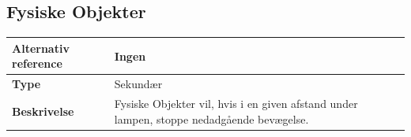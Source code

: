 \begin{table}[H] \centering
\subsection{Fysiske Objekter}
\begin{tabular}{|p{4cm}|p{8cm}|}
	\hline
	    \textbf{Alternativ reference}   & Ingen \\ \hline
	    \textbf{Type}                   & Sekundær \\ \hline
		\textbf{Beskrivelse}            & Fysiske Objekter vil, hvis i en given afstand under lampen, stoppe nedadgående bevægelse. \\ \hline
	\end{tabular}
\end{table}